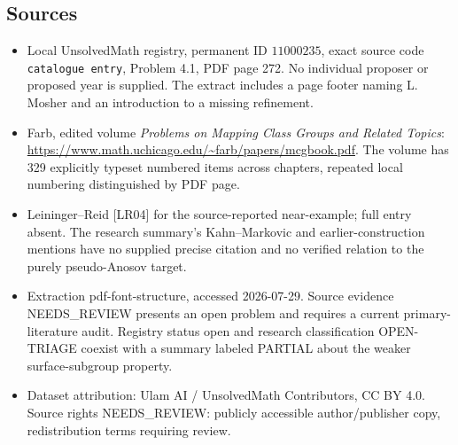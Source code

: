 \documentclass[11pt]{article}
\begin{document}
\subsection{Sources}
\begin{itemize}
\item Local UnsolvedMath registry, permanent ID \(11000235\), exact source code \texttt{catalogue entry}, Problem 4.1, PDF page 272. No individual proposer or proposed year is supplied. The extract includes a page footer naming L. Mosher and an introduction to a missing refinement.
\item Farb, edited volume \emph{Problems on Mapping Class Groups and Related Topics}: \url{https://www.math.uchicago.edu/~farb/papers/mcgbook.pdf}. The volume has 329 explicitly typeset numbered items across chapters, repeated local numbering distinguished by PDF page.
\item Leininger--Reid [LR04] for the source-reported near-example; full entry absent. The research summary's Kahn--Markovic and earlier-construction mentions have no supplied precise citation and no verified relation to the purely pseudo-Anosov target.
\item Extraction pdf-font-structure, accessed 2026-07-29. Source evidence NEEDS\_REVIEW presents an open problem and requires a current primary-literature audit. Registry status open and research classification OPEN-TRIAGE coexist with a summary labeled PARTIAL about the weaker surface-subgroup property.
\item Dataset attribution: Ulam AI / UnsolvedMath Contributors, CC BY 4.0. Source rights NEEDS\_REVIEW: publicly accessible author/publisher copy, redistribution terms requiring review.
\end{itemize}
\end{document}
